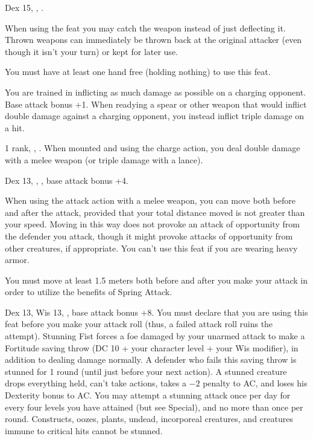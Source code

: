 {Dex 15, , .}
{When using the  feat you may catch the weapon instead of just deflecting it. Thrown weapons can immediately be thrown back at the original attacker (even though it isn't your turn) or kept for later use.

You must have at least one hand free (holding nothing) to use this feat.}

{You are trained in inflicting as much damage as possible on a charging opponent.}
{Base attack bonus +1.}
{When readying a spear or other weapon that would inflict double damage against a charging opponent, you instead inflict triple damage on a hit.}{}{}

{ 1 rank, , .}
{When mounted and using the charge action, you deal double damage with a melee weapon (or triple damage with a lance).}

{Dex 13, , , base attack bonus +4.}
{When using the attack action with a melee weapon, you can move both before and after the attack, provided that your total distance moved is not greater than your speed. Moving in this way does not provoke an attack of opportunity from the defender you attack, though it might provoke attacks of opportunity from other creatures, if appropriate. You can't use this feat if you are wearing heavy armor.

You must move at least 1.5 meters both before and after you make your attack in order to utilize the benefits of Spring Attack.}

{Dex 13, Wis 13, , base attack bonus +8.}
{You must declare that you are using this feat before you make your attack roll (thus, a failed attack roll ruins the attempt). Stunning Fist forces a foe damaged by your unarmed attack to make a Fortitude saving throw (DC 10 + \onehalf your character level + your Wis modifier), in addition to dealing damage normally. A defender who fails this saving throw is stunned for 1 round (until just before your next action). A stunned creature drops everything held, can't take actions, takes a $-2$ penalty to AC, and loses his Dexterity bonus to AC. You may attempt a stunning attack once per day for every four levels you have attained (but see Special), and no more than once per round. Constructs, oozes, plants, undead, incorporeal creatures, and creatures immune to critical hits cannot be stunned.}

